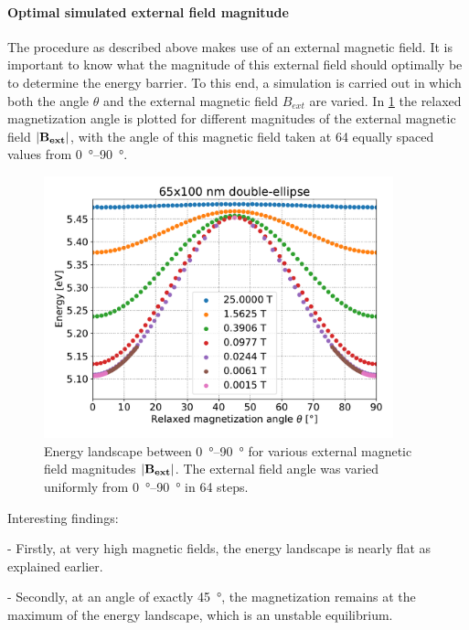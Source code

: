 \documentclass[10pt,a4paper]{article}
\begin{document}
\paragraph{Optimal simulated external field magnitude}
The procedure as described above makes use of an external magnetic field. It is important to know what the magnitude of this external field should optimally be to determine the energy barrier. To this end, a simulation is carried out in which both the angle $\theta$ and the external magnetic field $B_{ext}$ are varied. In \cref{fig:barrierLandscape-sweepBext} the relaxed magnetization angle is plotted for different magnitudes of the external magnetic field $\abs{\vb{B_{ext}}}$, with the angle of this magnetic field taken at 64 equally spaced values from \SIrange{0}{90}{\degree}.
\begin{figure}
    \centering
    \includegraphics[width=0.9\textwidth]{Figures/biaxial_island/BarrierLandscape/Plus_65_B25-0.001-div4_a128Pi_plotOptimized.pdf}
    \caption{Energy landscape between \SIrange{0}{90}{\degree} for various external magnetic field magnitudes $\abs{\vb{B_{ext}}}$. The external field angle was varied uniformly from \SIrange{0}{90}{\degree} in 64 steps.}
    \label{fig:barrierLandscape-sweepBext}
\end{figure}

Interesting findings:

- Firstly, at very high magnetic fields, the energy landscape is nearly flat as explained earlier.~\cite{Nonmonotonic_reversal}

- Secondly, at an angle of exactly \SI{45}{\degree}, the magnetization remains at the maximum of the energy landscape, which is an unstable equilibrium.
\end{document}
